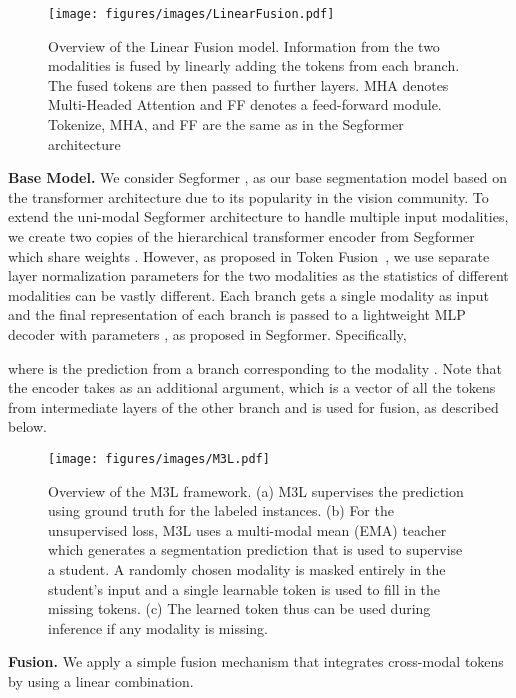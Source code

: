 \documentclass[10pt,twocolumn,letterpaper]{article}
\begin{document}
\begin{figure}
\begin{center}
\texttt{[image: figures/images/LinearFusion.pdf]}
\end{center}
\vspace{-5mm}
\caption{Overview of the Linear Fusion model. Information from the two modalities is fused by linearly adding the tokens from each branch. The fused tokens are then passed to further layers. MHA denotes Multi-Headed Attention and FF denotes a feed-forward module. Tokenize, MHA, and FF are the same as in the Segformer \cite{segformer} architecture}
\label{fig:linear-fusion}
\end{figure}
 
\noindent\textbf{Base Model.} We consider Segformer \cite{segformer}, as our base segmentation model based on the transformer architecture due to its popularity in the vision community.
To extend the uni-modal Segformer architecture to handle multiple input modalities, we create two copies of the hierarchical transformer encoder  from Segformer which share weights . 
However, as proposed in Token Fusion~\cite{tokenfusion}, we use separate layer normalization parameters  for the two modalities as the statistics of different modalities can be vastly different. 
Each branch gets a single modality  as input and the final representation of each branch is passed to a lightweight MLP decoder  with parameters , as proposed in Segformer. Specifically, 


 where  is the prediction from a branch corresponding to the modality . Note that the encoder  takes  as an additional argument, which is a vector of all the tokens from intermediate layers of the other branch  and is used for fusion, as described below.

\begin{figure*}
\begin{center}
\texttt{[image: figures/images/M3L.pdf]}
\end{center}
\vspace{-5mm}
\caption{Overview of the M3L framework. (a) M3L supervises the prediction using ground truth for the labeled instances. (b) For the unsupervised loss, M3L uses a multi-modal mean (EMA) teacher which generates a segmentation prediction that is used to supervise a student. A randomly chosen modality is masked entirely in the student's input and a single learnable token is used to fill in the missing tokens. (c) The learned token thus can be used during inference if any modality is missing.
}
\label{fig:M3L}
\end{figure*} 
\noindent\textbf{Fusion.} 
We apply a simple fusion mechanism that integrates cross-modal tokens by using a linear combination.
\end{document}
